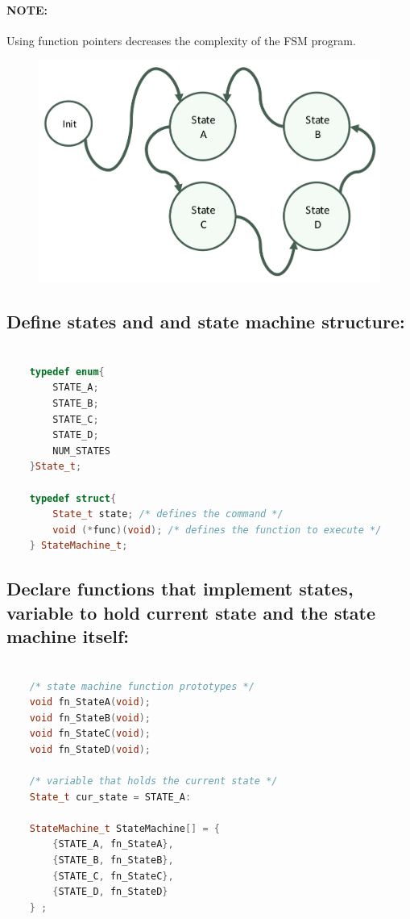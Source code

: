 \paragraph{NOTE:} Using function pointers decreases the complexity of the FSM program.


\begin{figure}[H]
    \centering
    \includegraphics[width=0.6\linewidth]{img/image_61.png}
\end{figure}

\subsection{Define states and and state machine structure:}
\begin{lstlisting}[language=c++]

    typedef enum{
        STATE_A;
        STATE_B;
        STATE_C;
        STATE_D;
        NUM_STATES
    }State_t;
    
    typedef struct{
        State_t state; /* defines the command */
        void (*func)(void); /* defines the function to execute */
    } StateMachine_t;
\end{lstlisting}



\subsection{Declare functions that implement states, variable to hold current state and the state machine itself:}

\begin{lstlisting}[language=c++]

    /* state machine function prototypes */
    void fn_StateA(void);
    void fn_StateB(void);
    void fn_StateC(void);
    void fn_StateD(void);
    
    /* variable that holds the current state */
    State_t cur_state = STATE_A:
    
    StateMachine_t StateMachine[] = {
        {STATE_A, fn_StateA},
        {STATE_B, fn_StateB},
        {STATE_C, fn_StateC},
        {STATE_D, fn_StateD}
    } ;
\end{lstlisting}

